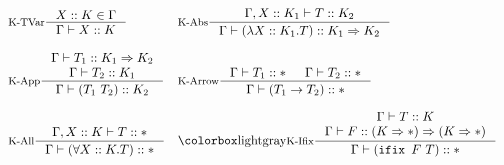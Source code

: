 \begin{figure}[!t]
  \centering
  \begin{displaymath}
  \begin{array}{ll}
  \inference[K-TVar]{X::K \in \Gamma}{\Gamma |- X :: K} &
  \inference[K-Abs]{\Gamma, X::K_1 |- T :: K_2}{\Gamma |- (\lambda X::K_1.T) :: K_1 \kindArrow K_2} \\
  \\
  \inference[K-App]{\Gamma |- T_1 :: K_1 \kindArrow K_2 \\ \Gamma |- T_2 :: K_1}{\Gamma |- (T_1 ~ T_2) :: K_2} &
  \inference[K-Arrow]{\Gamma |- T_1 :: \Type & \Gamma |- T_2 :: \Type}{\Gamma |- (T_1 \rightarrow T_2) :: \Type} \\
  \\
  \inference[K-All]{\Gamma, X::K |- T :: \Type}{\Gamma |- (\forall X::K.T) :: \Type} &
  \fomfDiff{\inference[K-Ifix]{\Gamma |- T:: K \\ \Gamma |- F :: (K \kindArrow \Type) \kindArrow (K \kindArrow \Type)} {\Gamma |- (\ifix ~ F ~ T) :: \Type} } 
  \end{array}
  \end{displaymath}
  \label{fig:fir_kinding}
\end{figure}
